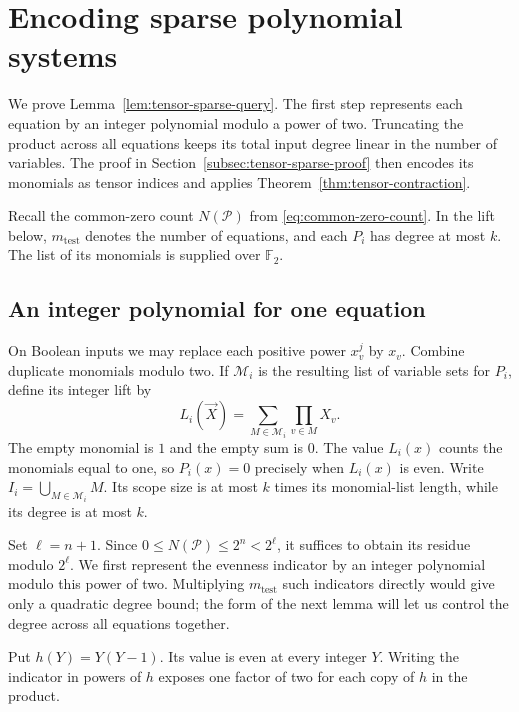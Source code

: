 \section{Encoding sparse polynomial systems}\label{sec:tensor-encoding}
We prove Lemma~\ref{lem:tensor-sparse-query}. The first step represents
each equation by an integer polynomial modulo a power of two. Truncating
the product across all equations keeps its total input degree linear
in the number of variables. The proof in
Section~\ref{subsec:tensor-sparse-proof} then encodes its monomials
as tensor indices and applies Theorem~\ref{thm:tensor-contraction}.

Recall the common-zero count $N(\mathcal P)$ from
\eqref{eq:common-zero-count}.
In the lift below, $m_{\mathrm{test}}$ denotes the number of equations,
and each $P_i$ has degree at most $k$. The list of its monomials
is supplied over $\mathbb F_2$.

\subsection{An integer polynomial for one equation}\label{subsec:rational-lift}
On Boolean inputs we may replace each positive power $x_v^j$ by $x_v$.
Combine duplicate monomials modulo two. If $\mathcal M_i$ is the
resulting list of variable sets for $P_i$, define its integer lift by
\[
 L_i(\vec X)=\sum_{M\in\mathcal M_i}\prod_{v\in M}X_v .
\]
The empty monomial is $1$ and the empty sum is $0$. The value $L_i(x)$
counts the monomials equal to one, so $P_i(x)=0$ precisely when
$L_i(x)$ is even. Write $I_i=\bigcup_{M\in\mathcal M_i}M$. Its scope size is at most $k$ times its monomial-list length,
while its degree is at most $k$.

Set $\ell=n+1$. Since $0\le N(\mathcal P)\le2^n<2^\ell$, it suffices
to obtain its residue modulo $2^\ell$. We first represent the
evenness indicator by an integer polynomial modulo this power of two.
Multiplying $m_{\mathrm{test}}$ such indicators directly would give
only a quadratic degree bound; the form of the next lemma will let us
control the degree across all equations together.

Put $h(Y)=Y(Y-1)$. Its value is even at every integer $Y$.
Writing the indicator in powers of $h$ exposes one factor of two for
each copy of $h$ in the product.

